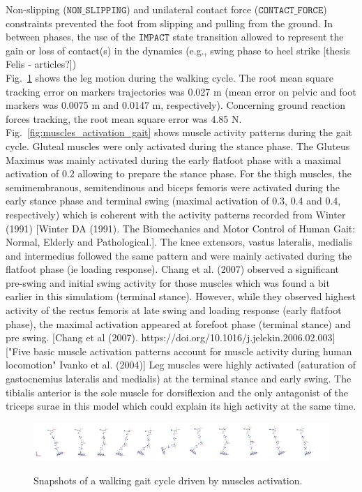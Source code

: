Non-slipping ($\mathtt{NON\_SLIPPING}$) and unilateral contact force ($\mathtt{CONTACT\_FORCE}$) constraints prevented the foot from slipping and pulling from the ground. 
In between phases, the use of the $\mathtt{IMPACT}$ state transition allowed to represent the gain or loss of contact(s) in the dynamics (e.g., swing phase to heel strike [thesis Felis - articles?]) \\

Fig.~\ref{fig:snapshots_multiphase_walking_cycle} shows the leg motion during the walking cycle. 
The root mean square tracking error on markers trajectories was 0.027 m (mean error on pelvic and foot markers was 0.0075 m and 0.0147 m, respectively). 
Concerning ground reaction forces tracking, the root mean square error was 4.85 N.
Fig.~\ref{fig:muscles_activation_gait} shows muscle activity patterns during the gait cycle.
Gluteal muscles were only activated during the stance phase. The Gluteus Maximus was mainly activated during the early flatfoot phase with a maximal activation of 0.2 allowing to prepare the stance phase. 
For the thigh muscles, the semimembranous, semitendinous and biceps femoris were activated during the early stance phase and terminal swing (maximal activation of 0.3, 0.4 and 0.4, respectively) which is coherent with the activity patterns recorded from Winter (1991) [Winter DA (1991). The Biomechanics and Motor Control of Human Gait: Normal, Elderly and Pathological.].  
The knee extensors, vastus lateralis, medialis and intermedius followed the same pattern and were mainly activated during the flatfoot phase (ie loading response). Chang et al. (2007) observed a significant pre-swing and initial swing activity for those muscles which was found a bit earlier in this simulatiom (terminal stance).
However, while they observed highest activity of the rectus femoris at late swing and loading response (early flatfoot phase), the maximal activation appeared at  forefoot phase (terminal stance) and pre swing. [Chang et al (2007). https://doi.org/10.1016/j.jelekin.2006.02.003]["Five basic muscle activation patterns account for muscle activity during human locomotion" Ivanko et al. (2004)] 
Leg muscles were highly activated (saturation of gastocnemius lateralis and medialis) at the terminal stance and early swing. The tibialis anterior is the sole muscle for dorsiflexion and the only antagonist of the triceps surae in this model which could explain its high activity at the same time. 

\begin{figure}[t!]
\centering
\includegraphics[width=\textwidth]{figures/multiphase_walking_cycle.png}\\
\caption{Snapshots of a walking gait cycle driven by muscles activation.}
\label{fig:snapshots_multiphase_walking_cycle}
\end{figure}


